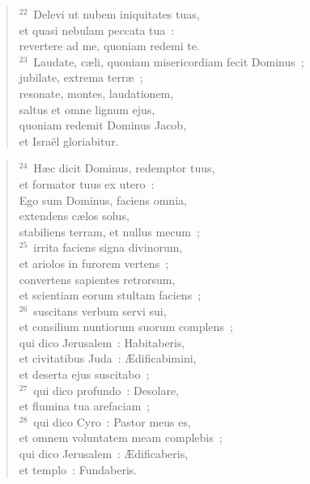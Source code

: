 \begin{flushleft}
\begin{verse}
${}^{22}$~Delevi ut nubem iniquitates tuas,\\ et quasi nebulam peccata tua~:\\ revertere ad me, quoniam redemi te.\\
${}^{23}$~Laudate, c\ae li, quoniam misericordiam fecit Dominus~;\\ jubilate, extrema terr\ae~;\\ resonate, montes, laudationem,\\ saltus et omne lignum ejus,\\ quoniam redemit Dominus Jacob,\\ et Isra\"el gloriabitur.\end{verse}\end{flushleft}


\begin{flushleft}\begin{verse}${}^{24}$~H\ae c dicit Dominus, redemptor tuus,\\ et formator tuus ex utero~:\\ Ego sum Dominus, faciens omnia,\\ extendens c\ae los solus,\\ stabiliens terram, et nullus mecum~;\\
${}^{25}$~irrita faciens signa divinorum,\\ et ariolos in furorem vertens~;\\ convertens sapientes retrorsum,\\ et scientiam eorum stultam faciens~;\\
${}^{26}$~suscitans verbum servi sui,\\ et consilium nuntiorum suorum complens~;\\ qui dico Jerusalem~: Habitaberis,\\ et civitatibus Juda~: \AE dificabimini,\\ et deserta ejus suscitabo~;\\
${}^{27}$~qui dico profundo~: Desolare,\\ et flumina tua arefaciam~;\\
${}^{28}$~qui dico Cyro~: Pastor meus es,\\ et omnem voluntatem meam complebis~;\\ qui dico Jerusalem~: \AE dificaberis,\\ et templo~: Fundaberis.\end{verse}\end{flushleft}


